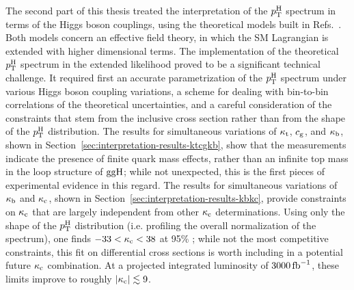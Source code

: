 The second part of this thesis treated the interpretation of the $p_\mathrm{T}^\mathrm{H}$ spectrum in terms of the Higgs boson couplings, using the theoretical models built in Refs.~\cite{Grazzini:2017szg,Grazzini:2016paz,Bishara:2016jga}.
% 
Both models concern an effective field theory, in which the SM Lagrangian is extended with higher dimensional terms.
% 
The implementation of the theoretical $p_\mathrm{T}^\mathrm{H}$ spectrum in the extended likelihood proved to be a significant technical challenge.
% 
It required first an accurate parametrization of the $p_\mathrm{T}^\mathrm{H}$ spectrum under various Higgs boson coupling variations, a scheme for dealing with bin-to-bin correlations of the theoretical uncertainties, and a careful consideration of the constraints that stem from the inclusive cross section rather than from the shape of the $p_\mathrm{T}^\mathrm{H}$ distribution.
% 
The results for simultaneous variations of $\kappa_{\mathrm{t}}$, $c_\mathrm{g}$, and $\kappa_{\mathrm{b}}$, shown in Section~\ref{sec:interpretation-results-ktcgkb}, show that the measurements indicate the presence of finite quark mass effects, rather than an infinite top mass in the loop structure of $\mathrm{g}\mathrm{g}\mathrm{H}$; while not unexpected, this is the first pieces of experimental evidence in this regard.
% 
The results for simultaneous variations of $\kappa_{\mathrm{b}}$ and $\kappa_{\mathrm{c}}$, shown in Section~\ref{sec:interpretation-results-kbkc}, provide constraints on $\kappa_{\mathrm{c}}$ that are largely independent from other $\kappa_{\mathrm{c}}$ determinations.
% 
Using only the shape of the $p_\mathrm{T}^\mathrm{H}$ distribution (i.e. profiling the overall normalization of the spectrum), one finds $-33 < \kappa_{\mathrm{c}} < 38$ at 95\% \CL; while not the most competitive constraints, this fit on differential cross sections is worth including in a potential future $\kappa_{\mathrm{c}}$ combination.
% 
At a projected integrated luminosity of $3000\,\text{fb}^{-1}$, these limits improve to roughly $\left| \kappa_{\mathrm{c}} \right |\lesssim9$.


